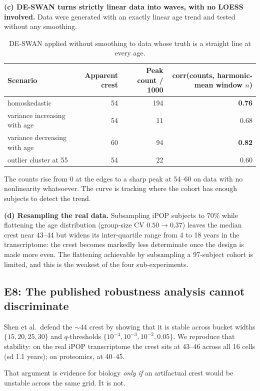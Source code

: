 \documentclass{article}
\begin{document}
\textbf{(c) DE-SWAN turns strictly linear data into waves, with no LOESS involved.} Data were generated with an exactly linear age trend and tested without any smoothing.

\begin{table}[h]
\centering
\caption{DE-SWAN applied without smoothing to data whose truth is a straight line at every age.}
\begin{tabular}{lrrr}
\toprule
Scenario & Apparent crest & Peak count / 1000 & corr(counts, harmonic-mean window $n$) \\
\midrule
homoskedastic & 54 & 194 & \textbf{0.76} \\
variance increasing with age & 54 & 11 & 0.68 \\
variance decreasing with age & 60 & 94 & \textbf{0.82} \\
outlier cluster at 55 & 54 & 22 & 0.60 \\
\bottomrule
\end{tabular}
\end{table}

The counts rise from 0 at the edges to a sharp peak at 54--60 on data with no nonlinearity whatsoever. The curve is tracking where the cohort has enough subjects to detect the trend.

\textbf{(d) Resampling the real data.} Subsampling iPOP subjects to 70\% while flattening the age distribution (group-size CV $0.50\rightarrow0.37$) leaves the median crest near 43--44 but widens its inter-quartile range from 4 to 18 years in the transcriptome: the crest becomes markedly less determinate once the design is made more even. The flattening achievable by subsampling a 97-subject cohort is limited, and this is the weakest of the four sub-experiments.

\subsection{E8: The published robustness analysis cannot discriminate}

Shen et al.\ defend the ${\sim}44$ crest by showing that it is stable across bucket widths $\{15,20,25,30\}$ and $q$-thresholds $\{10^{-4},10^{-3},10^{-2},0.05\}$. We reproduce that stability: on the real iPOP transcriptome the crest sits at 43--46 across all 16 cells (sd 1.1 years); on proteomics, at 40--45.

That argument is evidence for biology \emph{only if} an artifactual crest would be unstable across the same grid. It is not.
\end{document}
